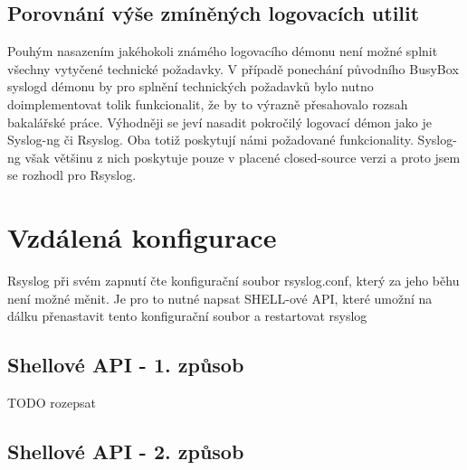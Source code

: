 \documentclass[thesis=B,czech]{FITthesis}[2012/06/26]
\begin{document}
\subsection*{Porovnání výše zmíněných logovacích utilit}
Pouhým nasazením jakéhokoli známého logovacího démonu není možné splnit všechny vytyčené technické požadavky. V případě ponechání původního BusyBox syslogd démonu by pro splnění technických požadavků bylo nutno doimplementovat tolik funkcionalit, že by to výrazně přesahovalo rozsah bakalářské práce.
Výhodněji se jeví nasadit pokročilý logovací démon jako je Syslog-ng či Rsyslog. Oba totiž poskytují námi požadované funkcionality. Syslog-ng však většinu z nich poskytuje pouze v placené closed-source verzi a proto jsem se rozhodl pro Rsyslog.

\section{Vzdálená konfigurace}
Rsyslog při svém zapnutí čte konfigurační soubor rsyslog.conf, který za jeho běhu není možné měnit. Je pro to nutné napsat SHELL-ové API, které umožní na dálku přenastavit tento konfigurační soubor a restartovat rsyslog

\subsection*{Shellové API - 1. způsob}

\begin{scriptsize}
\begin{verbatim}
set_log_verbosity.sh [component] [severity]
\end{verbatim}}
\end{scriptsize}

TODO rozepsat

\subsection*{Shellové API - 2. způsob}


\begin{scriptsize}
\begin{verbatim}
/etc/logging.conf
\end{verbatim}}
\end{scriptsize}

\begin{scriptsize}
\begin{verbatim}
component1  = DEBUG
componentXY = INFO
...
DEFAULT     = INFO
\end{verbatim}}
\end{scriptsize}
\end{document}
